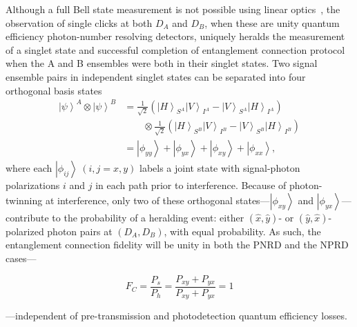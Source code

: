 \documentclass[aps,twocolumn,secnumarabic,amsmath,amssymb,pra,groupedaddress,
showpacs, showkeys,draft]{revtex4-1}
\newcommand{\ket}[1]{\left|#1\right\rangle}
\newcommand{\pna}[1]{\left(#1\right)}
\newcommand{\eqn}[1]{
\begin{equation}
	#1
\end{equation}
}
\begin{document}
Although a full Bell state measurement is not possible using linear
optics~\cite{PhysRevA.59.3295}, the observation of single clicks at both $D_A$
and $D_B$, when these are unity quantum efficiency photon-number resolving
detectors, uniquely heralds the measurement of a singlet state and successful
completion of entanglement connection protocol when the A and B ensembles were
both in their singlet states. Two signal ensemble pairs in independent singlet
states can be separated into four orthogonal basis states
\begin{align}
\ket{\psi}^A \otimes \ket{\psi}^B & =
\frac{1}{\sqrt{2}}\pna{\ket{H}_{S^A}\ket{V}_{I^A}-\ket{V}_{S^A}\ket{H}_{I^A}}\nonumber
\\ 
& \qquad \otimes \frac{1}{\sqrt{2}}\pna{\ket{H}_{S^B}\ket{V}_{I^B}-\ket{V}_{S^B}\ket{H}_{I^B}} \nonumber \\
& = \ket{\phi_{yy}}+\ket{\phi_{yx}}+\ket{\phi_{xy}}+\ket{\phi_{xx}},
\end{align}
where each $\ket{\phi_{ij}}~\pna{i,j=x,y}$ labels a joint state with
signal-photon polarizations $i$ and $j$ in each path prior to interference.
Because of photon-twinning at interference, only two of these orthogonal
states---$\ket{\phi_{xy}}$ and $\ket{\phi_{yx}}$---contribute to the
probability of a heralding event: either $\pna{\hat{x},\hat{y}}$- or
$\pna{\hat{y},\hat{x}}$-polarized photon pairs at $\pna{D_A,D_B}$, with equal
probability.  As such, the entanglement connection fidelity will be unity in
both the PNRD and the NPRD cases---
\eqn{
F_C = \frac{P_{s}}{P_{h}} = \frac{P_{xy}+P_{yx}}{P_{xy}+P_{yx}}=1
}
---independent of pre-transmission and photodetection quantum efficiency losses. 
\end{document}
